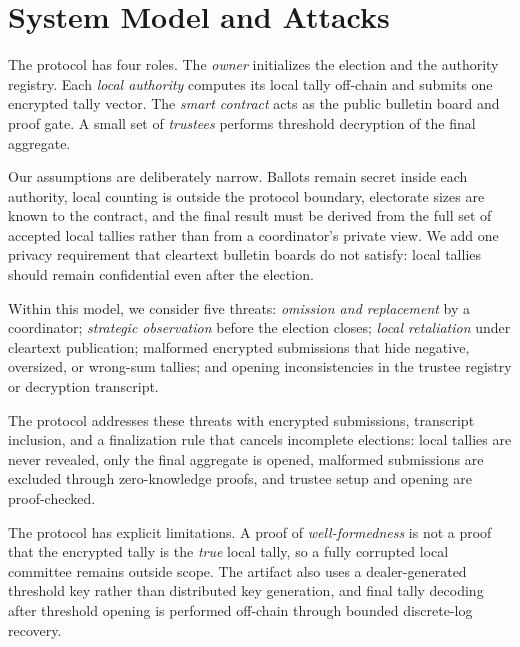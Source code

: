 
\section{System Model and Attacks}

The protocol has four roles. The \emph{owner} initializes the election and the
authority registry. Each \emph{local authority} computes its local tally
off-chain and submits one encrypted tally vector. The \emph{smart contract}
acts as the public bulletin board and proof gate. A small set of
\emph{trustees} performs threshold decryption of the final aggregate.

Our assumptions are deliberately narrow. Ballots remain secret inside each
authority, local counting is outside the protocol boundary, electorate sizes
are known to the contract, and the final result must be derived from the full
set of accepted local tallies rather than from a coordinator's private view.
We add one privacy requirement that cleartext bulletin boards do not satisfy:
local tallies should remain confidential even after the election.

Within this model, we consider five threats: \emph{omission and replacement} by a
coordinator; \emph{strategic observation} before the election closes;
\emph{local retaliation} under cleartext publication; malformed encrypted
submissions that hide negative, oversized, or wrong-sum tallies; and opening
inconsistencies in the trustee registry or decryption transcript.

The protocol addresses these threats with encrypted submissions, transcript
inclusion, and a finalization rule that cancels incomplete elections: local
tallies are never revealed, only the final aggregate is opened, malformed
submissions are excluded through zero-knowledge proofs, and trustee setup and
opening are proof-checked.

The protocol has explicit limitations. A proof of \emph{well-formedness} is
not a proof that the encrypted tally is the \emph{true} local tally, so a
fully corrupted local committee remains outside scope. The artifact also uses
a dealer-generated threshold key rather than distributed key generation, and
final tally decoding after threshold opening is performed off-chain through
bounded discrete-log recovery.
